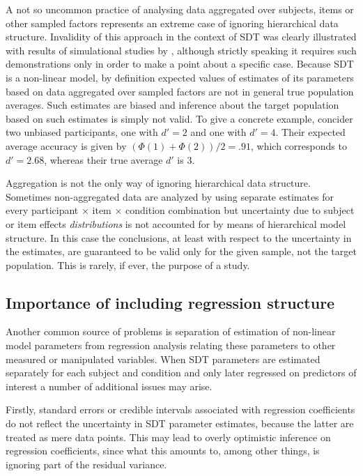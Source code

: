 \documentclass[oneside,a4paper]{article}
\begin{document}
A not so uncommon practice of analysing data aggregated over subjects,
items or other sampled factors represents an extreme case of ignoring
hierarchical data structure. Invalidity of this approach in the
context of SDT was clearly illustrated with results of simulational
studies by , although strictly speaking it
requires such demonstrations only in order to make a point about a
specific case. Because SDT is a non-linear model, by definition
expected values of estimates of its parameters based on data
aggregated over sampled factors are not in general true population
averages. Such estimates are biased and inference about the target
population based on such estimates is simply not valid. To give a
concrete example, concider two unbiased participants, one with
$d' = 2$ and one with $d' = 4$. Their expected average accuracy is
given by $(\Phi(1) + \Phi(2)) / 2 = .91$, which corresponds to
$d' = 2.68$, whereas their true average $d'$ is $3$.

Aggregation is not the only way of ignoring hierarchical data
structure. Sometimes non-aggregated data are analyzed by using
separate estimates for every participant $\times$ item $\times$
condition combination but uncertainty due to subject or item effects
\emph{distributions} is not accounted for by means of hierarchical
model structure. In this case the conclusions, at least with respect
to the uncertainty in the estimates, are guaranteed to be valid only
for the given sample, not the target population. This is rarely, if
ever, the purpose of a study.

\subsection{Importance of including regression structure}

Another common source of problems is separation of estimation of
non-linear model parameters from regression analysis relating these
parameters to other measured or manipulated variables. When SDT
parameters are estimated separately for each subject and condition and
only later regressed on predictors of interest a number of additional
issues may arise.

Firstly, standard errors or credible intervals associated with
regression coefficients do not reflect the uncertainty in SDT
parameter estimates, because the latter are treated as mere data
points. This may lead to overly optimistic inference on regression
coefficients, since what this amounts to, among other things, is
ignoring part of the residual variance.
\end{document}
